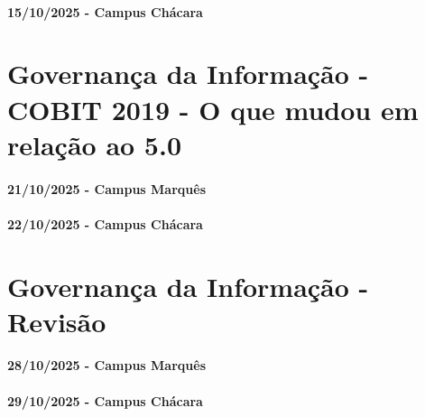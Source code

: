 \documentclass[
]{book}
\begin{document}
\subsubsection*{15/10/2025 - Campus Chácara}\label{campus-chuxe1cara-9}

\chapter{Governança da Informação - COBIT 2019 - O que mudou em relação ao 5.0}\label{governanuxe7a-da-informauxe7uxe3o---cobit-2019---o-que-mudou-em-relauxe7uxe3o-ao-5.0}

\subsubsection*{21/10/2025 - Campus Marquês}\label{campus-marquuxeas-10}

\subsubsection*{22/10/2025 - Campus Chácara}\label{campus-chuxe1cara-10}

\chapter{Governança da Informação - Revisão}\label{governanuxe7a-da-informauxe7uxe3o---revisuxe3o}

\subsubsection*{28/10/2025 - Campus Marquês}\label{campus-marquuxeas-11}

\subsubsection*{29/10/2025 - Campus Chácara}\label{campus-chuxe1cara-11}

  
\end{document}
